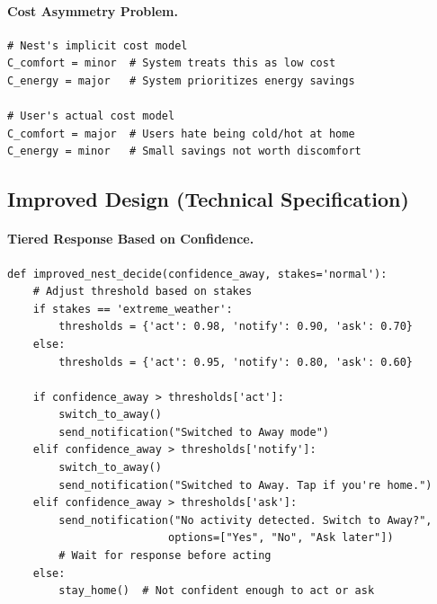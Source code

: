 \paragraph{Cost Asymmetry Problem.}
\begin{lstlisting}[style=python, caption={Misaligned cost models}]
# Nest's implicit cost model
C_comfort = minor  # System treats this as low cost
C_energy = major   # System prioritizes energy savings

# User's actual cost model
C_comfort = major  # Users hate being cold/hot at home
C_energy = minor   # Small savings not worth discomfort
\end{lstlisting}

\subsection{Improved Design (Technical Specification)}

\paragraph{Tiered Response Based on Confidence.}

\begin{lstlisting}[style=python, caption={Improved Nest decision logic with tiered responses}]
def improved_nest_decide(confidence_away, stakes='normal'):
    # Adjust threshold based on stakes
    if stakes == 'extreme_weather':
        thresholds = {'act': 0.98, 'notify': 0.90, 'ask': 0.70}
    else:
        thresholds = {'act': 0.95, 'notify': 0.80, 'ask': 0.60}

    if confidence_away > thresholds['act']:
        switch_to_away()
        send_notification("Switched to Away mode")
    elif confidence_away > thresholds['notify']:
        switch_to_away()
        send_notification("Switched to Away. Tap if you're home.")
    elif confidence_away > thresholds['ask']:
        send_notification("No activity detected. Switch to Away?",
                         options=["Yes", "No", "Ask later"])
        # Wait for response before acting
    else:
        stay_home()  # Not confident enough to act or ask
\end{lstlisting}

